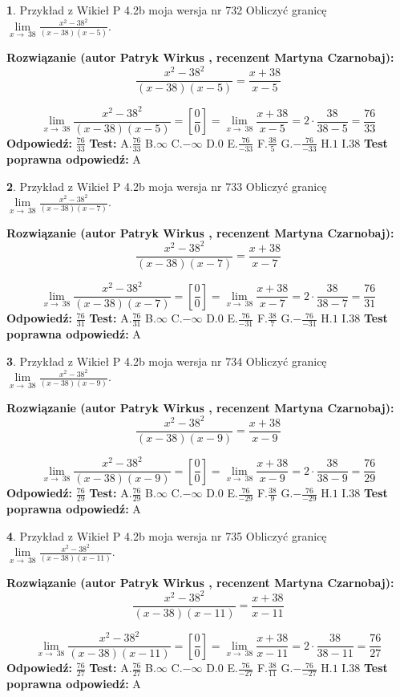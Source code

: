 \documentclass[12pt, a4paper]{article}
\theoremstyle{definition} %
\newtheorem{zad}{}
\newcommand{\zadStart}[1]{\begin{zad}#1\newline}
\newcommand{\zadStop}{\end{zad}}
\newcommand{\rozwStart}[2]{\noindent \textbf{Rozwiązanie (autor #1 , recenzent #2): }\newline}
\newcommand{\rozwStop}{\newline}
\newcommand{\odpStart}{\noindent \textbf{Odpowiedź:}\newline}
\newcommand{\odpStop}{\newline}
\newcommand{\testStart}{\noindent \textbf{Test:}\newline}
\newcommand{\testStop}{\newline}
\newcommand{\kluczStart}{\noindent \textbf{Test poprawna odpowiedź:}\newline}
\newcommand{\kluczStop}{\newline}
\begin{document}
\zadStart{Przykład z Wikieł P 4.2b moja wersja nr 732}
Obliczyć granicę $\lim\limits_{x\to\ 38}\frac{x^{2}-38^{2}}{(x-38)(x-5)}$.
\zadStop
\rozwStart{Patryk Wirkus}{Martyna Czarnobaj}
$$\frac{x^{2}-38^{2}}{(x-38)(x-5)}=\frac{x+38}{x-5}$$

$$\lim\limits_{x\to\ 38}\frac{x^{2}-38^{2}}{(x-38)(x-5)}=[\frac{0}{0}]=\lim\limits_{x\to\ 38}\frac{x+38}{x-5}=2 \cdot \frac{38}{38-5} = \frac{76}{33}$$
\rozwStop
\odpStart
$\frac{76}{33}$
\odpStop
\testStart
A.$\frac{76}{33}$
B.$\infty$
C.$-\infty$
D.$0$
E.$\frac{76}{-33}$
F.$\frac{38}{5}$
G.$-\frac{76}{-33}$
H.$1$
I.$38$
\testStop
\kluczStart
A
\kluczStop



\zadStart{Przykład z Wikieł P 4.2b moja wersja nr 733}
Obliczyć granicę $\lim\limits_{x\to\ 38}\frac{x^{2}-38^{2}}{(x-38)(x-7)}$.
\zadStop
\rozwStart{Patryk Wirkus}{Martyna Czarnobaj}
$$\frac{x^{2}-38^{2}}{(x-38)(x-7)}=\frac{x+38}{x-7}$$

$$\lim\limits_{x\to\ 38}\frac{x^{2}-38^{2}}{(x-38)(x-7)}=[\frac{0}{0}]=\lim\limits_{x\to\ 38}\frac{x+38}{x-7}=2 \cdot \frac{38}{38-7} = \frac{76}{31}$$
\rozwStop
\odpStart
$\frac{76}{31}$
\odpStop
\testStart
A.$\frac{76}{31}$
B.$\infty$
C.$-\infty$
D.$0$
E.$\frac{76}{-31}$
F.$\frac{38}{7}$
G.$-\frac{76}{-31}$
H.$1$
I.$38$
\testStop
\kluczStart
A
\kluczStop



\zadStart{Przykład z Wikieł P 4.2b moja wersja nr 734}
Obliczyć granicę $\lim\limits_{x\to\ 38}\frac{x^{2}-38^{2}}{(x-38)(x-9)}$.
\zadStop
\rozwStart{Patryk Wirkus}{Martyna Czarnobaj}
$$\frac{x^{2}-38^{2}}{(x-38)(x-9)}=\frac{x+38}{x-9}$$

$$\lim\limits_{x\to\ 38}\frac{x^{2}-38^{2}}{(x-38)(x-9)}=[\frac{0}{0}]=\lim\limits_{x\to\ 38}\frac{x+38}{x-9}=2 \cdot \frac{38}{38-9} = \frac{76}{29}$$
\rozwStop
\odpStart
$\frac{76}{29}$
\odpStop
\testStart
A.$\frac{76}{29}$
B.$\infty$
C.$-\infty$
D.$0$
E.$\frac{76}{-29}$
F.$\frac{38}{9}$
G.$-\frac{76}{-29}$
H.$1$
I.$38$
\testStop
\kluczStart
A
\kluczStop



\zadStart{Przykład z Wikieł P 4.2b moja wersja nr 735}
Obliczyć granicę $\lim\limits_{x\to\ 38}\frac{x^{2}-38^{2}}{(x-38)(x-11)}$.
\zadStop
\rozwStart{Patryk Wirkus}{Martyna Czarnobaj}
$$\frac{x^{2}-38^{2}}{(x-38)(x-11)}=\frac{x+38}{x-11}$$

$$\lim\limits_{x\to\ 38}\frac{x^{2}-38^{2}}{(x-38)(x-11)}=[\frac{0}{0}]=\lim\limits_{x\to\ 38}\frac{x+38}{x-11}=2 \cdot \frac{38}{38-11} = \frac{76}{27}$$
\rozwStop
\odpStart
$\frac{76}{27}$
\odpStop
\testStart
A.$\frac{76}{27}$
B.$\infty$
C.$-\infty$
D.$0$
E.$\frac{76}{-27}$
F.$\frac{38}{11}$
G.$-\frac{76}{-27}$
H.$1$
I.$38$
\testStop
\kluczStart
A
\kluczStop
\end{document}
